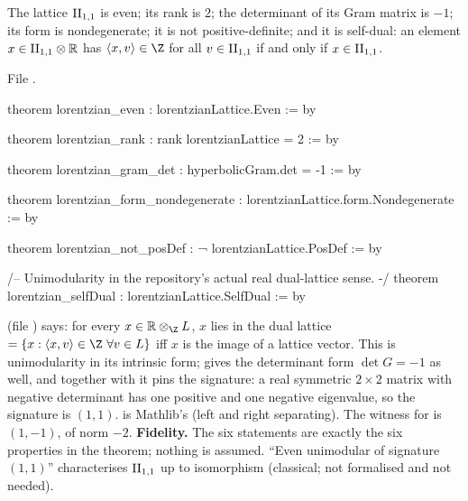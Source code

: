 \begin{theorem}\label{ch17:thm:latticeprops}
The lattice ${\mathrm{II}_{1,1}}$ is even; its rank is $2$; the determinant of its Gram matrix is $-1$; its form
is nondegenerate; it is not positive-definite; and it is self-dual: an element $x\in{\mathrm{II}_{1,1}}\otimes\mathbb R$
has $\langle x,v\rangle\in\Z$ for all $v\in{\mathrm{II}_{1,1}}$ if and only if $x\in{\mathrm{II}_{1,1}}$.
\end{theorem}

\noindent File .
\begin{leancode}
theorem lorentzian_even : lorentzianLattice.Even := by

theorem lorentzian_rank : rank lorentzianLattice = 2 := by

theorem lorentzian_gram_det : hyperbolicGram.det = -1 := by

theorem lorentzian_form_nondegenerate : lorentzianLattice.form.Nondegenerate := by

theorem lorentzian_not_posDef : ¬ lorentzianLattice.PosDef := by

/-- Unimodularity in the repository's actual real dual-lattice sense. -/
theorem lorentzian_selfDual : lorentzianLattice.SelfDual := by
\end{leancode}

\begin{dictionary}
 (file ) says: for every
$x\in\mathbb R\otimes_\Z L$, $x$ lies in the dual lattice 
$=\{x:\langle x,v\rangle\in\Z\ \forall v\in L\}$ iff $x$ is the image of a lattice vector.  This is
unimodularity in its intrinsic form;  gives the determinant form
$\det G=-1$ as well, and together with  it pins the signature: a real symmetric
$2\times2$ matrix with negative determinant has one positive and one negative eigenvalue, so the signature
is $(1,1)$.   is Mathlib's  (left and right
separating).  The witness for  is $(1,-1)$, of norm $-2$.  \textbf{Fidelity.}
The six statements are exactly the six properties in the theorem; nothing is assumed.  ``Even unimodular
of signature $(1,1)$'' characterises ${\mathrm{II}_{1,1}}$ up to isomorphism (classical; not formalised and not needed).
\end{dictionary}

